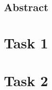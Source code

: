 \documentclass[10pt,letterpaper,titlepage]{article}
\begin{document}
\title{\Report}
\date{\today}
\author{\Author \\ \Class \\ \Professor}	

\rhead{\Last}
\lhead{\Report}
\pagestyle{fancy}

\maketitle

\section*{Abstract}
\newpage

\tableofcontents

\listoffigures

\newpage
\chapter{Task 1}


\chapter{Task 2}



\newpage
{}


\end{document}
